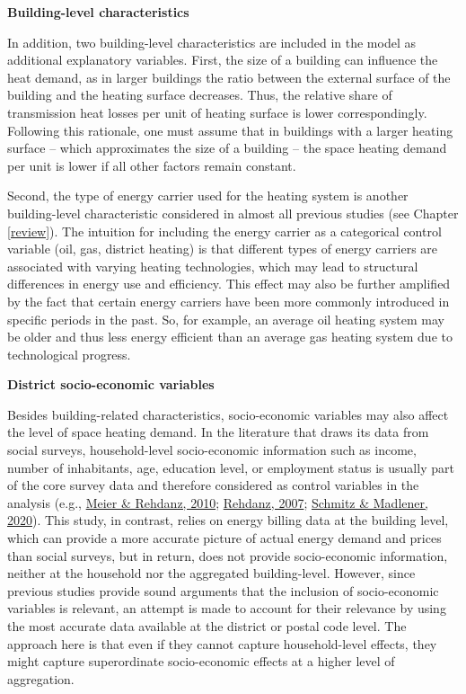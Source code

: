 \documentclass[12pt,twoside]{reedthesis}
\begin{document}
\textbf{Building-level characteristics}

In addition, two building-level characteristics are included in the model as additional explanatory variables. First, the size of a building can influence the heat demand, as in larger buildings the ratio between the external surface of the building and the heating surface decreases. Thus, the relative share of transmission heat losses per unit of heating surface is lower correspondingly. Following this rationale, one must assume that in buildings with a larger heating surface -- which approximates the size of a building -- the space heating demand per unit is lower if all other factors remain constant.

Second, the type of energy carrier used for the heating system is another building-level characteristic considered in almost all previous studies (see Chapter \ref{review}). The intuition for including the energy carrier as a categorical control variable (oil, gas, district heating) is that different types of energy carriers are associated with varying heating technologies, which may lead to structural differences in energy use and efficiency. This effect may also be further amplified by the fact that certain energy carriers have been more commonly introduced in specific periods in the past. So, for example, an average oil heating system may be older and thus less energy efficient than an average gas heating system due to technological progress.

\textbf{District socio-economic variables}

Besides building-related characteristics, socio-economic variables may also affect the level of space heating demand. In the literature that draws its data from social surveys, household-level socio-economic information such as income, number of inhabitants, age, education level, or employment status is usually part of the core survey data and therefore considered as control variables in the analysis (e.g., \protect\hyperlink{ref-meier_rehdanz10}{Meier \& Rehdanz, 2010}; \protect\hyperlink{ref-rehdanz07}{Rehdanz, 2007}; \protect\hyperlink{ref-schmitz_madlener20}{Schmitz \& Madlener, 2020}). This study, in contrast, relies on energy billing data at the building level, which can provide a more accurate picture of actual energy demand and prices than social surveys, but in return, does not provide socio-economic information, neither at the household nor the aggregated building-level. However, since previous studies provide sound arguments that the inclusion of socio-economic variables is relevant, an attempt is made to account for their relevance by using the most accurate data available at the district or postal code level. The approach here is that even if they cannot capture household-level effects, they might capture superordinate socio-economic effects at a higher level of aggregation.
\end{document}
